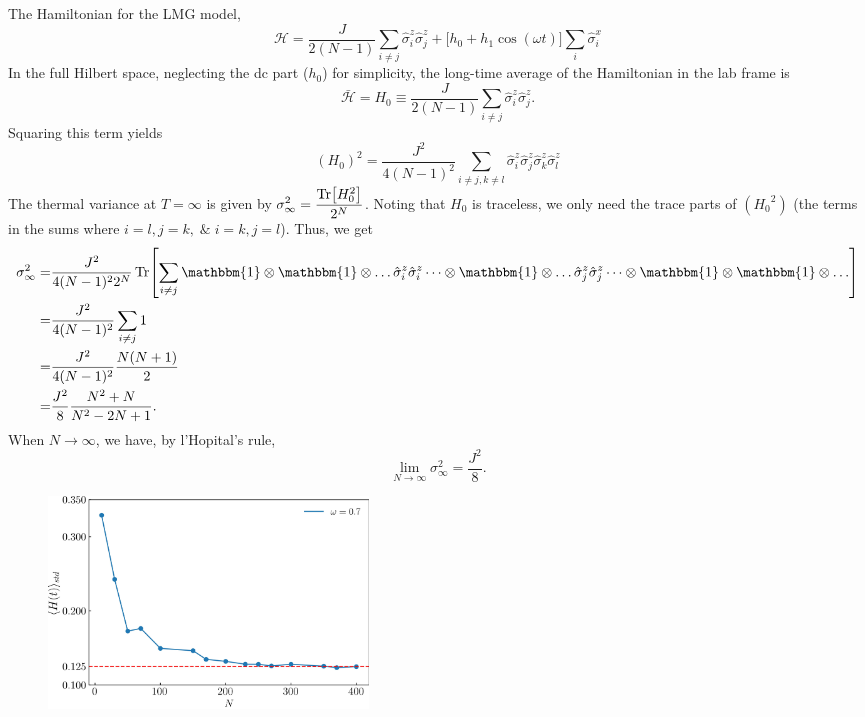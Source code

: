 \documentclass[aps,prb,reprint,showpacs,floatfix,superscriptaddress, onecolumn, nofootinbib, 9pt]{revtex4-2}
\begin{document}
\begin{enumerate}
{			
			The Hamiltonian for the LMG model,
			\begin{equation}
				\mathcal{H} = \frac{J}{2(N-1)}\sum_{i\neq j}\hat{\sigma}^z_i \hat{\sigma}^z_j +\Big[h_0 +h_1 \cos(\omega t)\Big] \sum_i \hat{\sigma}^x_i
			\end{equation}
			In the full Hilbert space, neglecting the dc part ($h_0$) for simplicity, the long-time average of the Hamiltonian in the lab frame is
			\begin{equation*}
			\bar{\mathcal{H}}	= {H}_0 \equiv \frac{J}{2(N-1)}\sum_{i\neq j}\hat{\sigma}^z_i \hat{\sigma}^z_j.
			\end{equation*}
			Squaring this term yields
			\begin{equation}
				\left({H_0}\right)^2 = \frac{J^2}{4(N-1)^2}\sum_{i\neq j, k \neq l} \hat{\sigma}^z_i \hat{\sigma}^z_j \hat{\sigma}^z_k \hat{\sigma}^z_l 
			\end{equation}
			The thermal variance at $T= \infty$ is given by $\displaystyle \sigma^2_{\infty} = \frac{\Tr[H^2_0]}{2^N}$. 
			Noting that ${H_0}$ is traceless, we only need the trace parts of $\left({H_0}^2\right)$ (the terms in the sums where $i=l, j=k,\;\&\;i=k, j=l$). Thus, we get
			\begin{align*}
				\sigma_\infty^2 =& \frac{J^2}{4(N-1)^2 2^N}\Tr[\sum_{i\neq j} \mathbbm{1}\otimes\mathbbm{1}\otimes \dots\hat{\sigma}^z_i \hat{\sigma}^z_i\dots\otimes \mathbbm{1} \otimes \dots \hat{\sigma}^z_j\hat{\sigma}^z_j \dots\otimes \mathbbm{1} \otimes\mathbbm{1}\otimes \dots]\\
				=& \frac{J^2}{4(N-1)^2}   \sum_{i\neq j} 1\\
				=& \frac{J^2}{4(N-1)^2} \frac{N(N+1)}{2}\\
				=& \frac{J^2}{8} \frac{N^2+N}{N^2-2N+1}.
			\end{align*}
			When $N\rightarrow \infty$, we have, by l'Hopital's rule,
			\begin{equation}
				\lim\limits_{N\rightarrow\infty}\sigma_\infty^2 = \frac{J^2}{8}.
				\label{eq:std_inf}
			\end{equation} 
			\begin{figure}[h!]
				\includegraphics[width=8.5cm]{hbar_avg_std_w0p7.jpg}

\end{figure}}
\end{enumerate}
\end{document}
